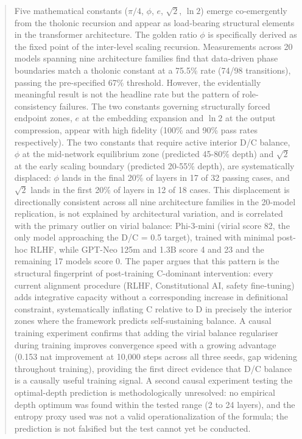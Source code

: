 \documentclass[12pt]{article}
\begin{document}
\begin{abstract}
Five mathematical constants (\(\pi/4\), \(\phi\), \(e\), \(\sqrt{2}\),
\(\ln 2\)) emerge co-emergently from the tholonic recursion and appear
as load-bearing structural elements in the transformer architecture. The
golden ratio \(\phi\) is specifically derived as the fixed point of the
inter-level scaling recursion. Measurements across 20 models spanning
nine architecture families find that data-driven phase boundaries match
a tholonic constant at a 75.5\% rate (74/98 transitions), passing the
pre-specified 67\% threshold. However, the evidentially meaningful
result is not the headline rate but the pattern of role-consistency
failures. The two constants governing structurally forced endpoint
zones, \(e\) at the embedding expansion and \(\ln 2\) at the output
compression, appear with high fidelity (100\% and 90\% pass rates
respectively). The two constants that require active interior D/C
balance, \(\phi\) at the mid-network equilibrium zone (predicted 45-80\%
depth) and \(\sqrt{2}\) at the early scaling boundary (predicted 20-55\%
depth), are systematically displaced: \(\phi\) lands in the final 20\%
of layers in 17 of 32 passing cases, and \(\sqrt{2}\) lands in the first
20\% of layers in 12 of 18 cases. This displacement is directionally
consistent across all nine architecture families in the 20-model
replication, is not explained by architectural variation, and is
correlated with the primary outlier on virial balance: Phi-3-mini
(virial score 82, the only model approaching the D/C = 0.5 target),
trained with minimal post-hoc RLHF, while GPT-Neo 125m and 1.3B score 4
and 23 and the remaining 17 models score 0. The paper argues that this
pattern is the structural fingerprint of post-training C-dominant
intervention: every current alignment procedure (RLHF, Constitutional
AI, safety fine-tuning) adds integrative capacity without a
corresponding increase in definitional constraint, systematically
inflating C relative to D in precisely the interior zones where the
framework predicts self-sustaining balance. A causal training experiment
confirms that adding the virial balance regulariser during training
improves convergence speed with a growing advantage (0.153 nat
improvement at 10,000 steps across all three seeds, gap widening
throughout training), providing the first direct evidence that D/C
balance is a causally useful training signal. A second causal experiment
testing the optimal-depth prediction is methodologically unresolved: no
empirical depth optimum was found within the tested range (2 to 24
layers), and the entropy proxy used was not a valid operationalization
of the formula; the prediction is not falsified but the test cannot yet
be conducted.


\end{abstract}
\end{document}
